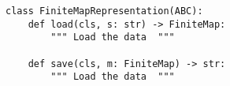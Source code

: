 \begin{verbatim}
class FiniteMapRepresentation(ABC):
    def load(cls, s: str) -> FiniteMap:
        """ Load the data  """

    def save(cls, m: FiniteMap) -> str:
        """ Load the data  """
\end{verbatim}